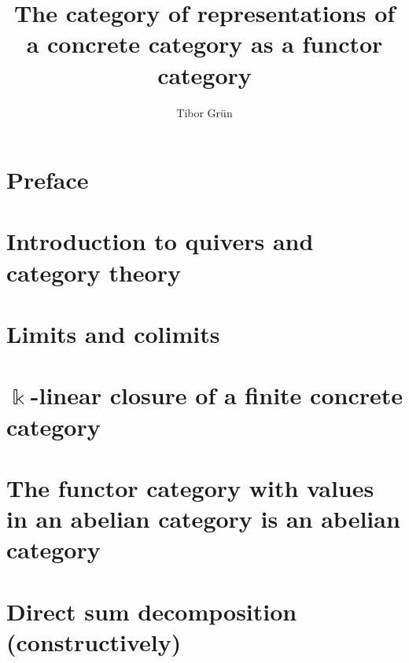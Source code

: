 \documentclass{article}
\title{The category of representations of a concrete category as a functor category}
\author{Tibor Gr{\"u}n}
\begin{document}

	\maketitle

	\newpage

	\tableofcontents\label{toc}
	
	\newpage

	
\section*{Preface}

\section{Introduction to quivers and category theory}


\section{Limits and colimits}


\section{$\Bbbk$-linear closure of a finite concrete category}


%

\section{The functor category with values in an abelian category is an abelian category}




\section{Direct sum decomposition (constructively)}

\end{document}
